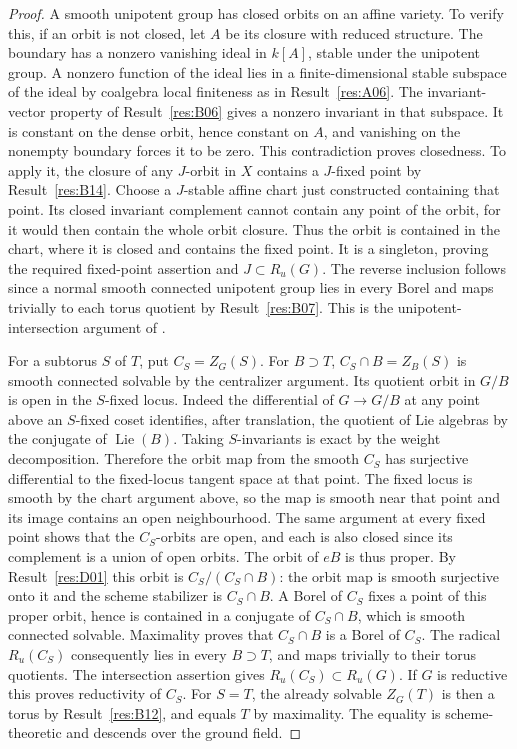 \documentclass[11pt,a4paper,openany,oneside]{book}
\theoremstyle{resultstyle}
\theoremstyle{definition}
\numberwithin{equation}{chapter}
\DeclareMathOperator{\Lie}{Lie}
\begin{document}
\begin{proof}
A smooth unipotent group has closed orbits on an affine variety.
To verify this, if an orbit is not closed, let \(A\) be its
closure with reduced structure. The boundary has a nonzero
vanishing ideal in \(k[A]\), stable under the unipotent group.
A nonzero function of the ideal lies in a finite-dimensional
stable subspace of the ideal by coalgebra local finiteness
as in Result~\ref{res:A06}. The invariant-vector property of
Result~\ref{res:B06} gives a nonzero invariant in that subspace.
It is constant on the dense orbit, hence constant on \(A\),
and vanishing on the nonempty boundary forces it to be zero.
This contradiction proves closedness. To apply it, the closure
of any \(J\)-orbit in \(X\) contains a \(J\)-fixed point by
Result~\ref{res:B14}. Choose a \(J\)-stable affine chart just
constructed containing that point. Its closed invariant
complement cannot contain any point of the orbit, for it would
then contain the whole orbit closure. Thus the orbit is contained
in the chart, where it is closed and contains the fixed point.
It is a singleton, proving the required fixed-point assertion
and \(J\subset R_u(G)\). The reverse inclusion follows since a
normal smooth connected unipotent group lies in every Borel
and maps trivially to each torus quotient by
Result~\ref{res:B07}. This is the unipotent-intersection argument
of \cite[Sections 17.g--17.h]{milne}.

For a subtorus \(S\) of \(T\), put \(C_S=Z_G(S)\).
For \(B\supset T\), \(C_S\cap B=Z_B(S)\) is smooth connected
solvable by the centralizer argument. Its quotient orbit
in \(G/B\) is open in the \(S\)-fixed locus. Indeed the
differential of \(G\to G/B\) at any point above an \(S\)-fixed
coset identifies, after translation, the quotient of Lie
algebras by the conjugate of \(\Lie(B)\). Taking \(S\)-invariants
is exact by the weight decomposition. Therefore the orbit map
from the smooth \(C_S\) has surjective differential to the
fixed-locus tangent space at that point. The fixed locus is
smooth by the chart argument above, so the map is smooth near
that point and its image contains an open neighbourhood.
The same argument at every fixed point shows that the
\(C_S\)-orbits are open, and each is also closed since its
complement is a union of open orbits. The orbit of \(eB\)
is thus proper. By Result~\ref{res:D01} this orbit is
\(C_S/(C_S\cap B)\): the orbit map is smooth surjective onto
it and the scheme stabilizer is \(C_S\cap B\).
A Borel of \(C_S\) fixes a point of this proper orbit,
hence is contained in a conjugate of \(C_S\cap B\),
which is smooth connected solvable. Maximality proves
that \(C_S\cap B\) is a Borel of \(C_S\).
The radical \(R_u(C_S)\) consequently lies in every
\(B\supset T\), and maps trivially to their torus quotients.
The intersection assertion gives \(R_u(C_S)\subset R_u(G)\).
If \(G\) is reductive this proves reductivity of \(C_S\).
For \(S=T\), the already solvable \(Z_G(T)\) is then a
torus by Result~\ref{res:B12}, and equals \(T\) by maximality.
The equality is scheme-theoretic and descends over the
ground field.


\end{proof}
\end{document}

